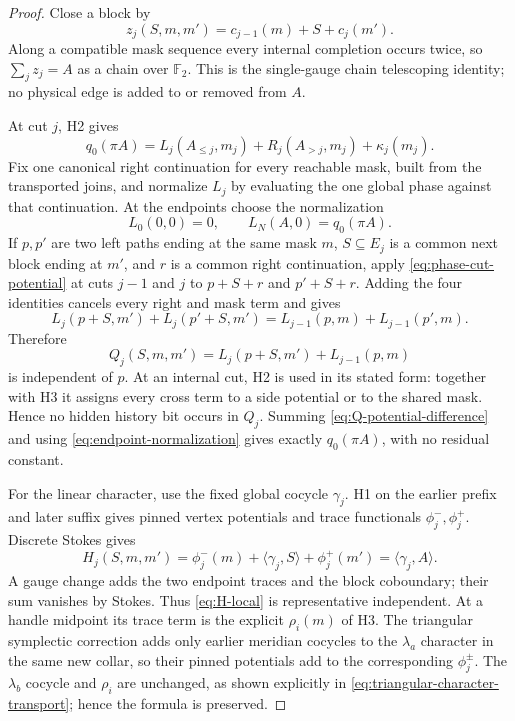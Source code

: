 \documentclass[11pt]{article}
\newcommand{\Ftwo}{\mathbb F_2}
\begin{document}
\begin{proof}
Close a block by
\[
 z_j(S,m,m')=c_{j-1}(m)+S+c_j(m').
\]
Along a compatible mask sequence every internal completion occurs twice, so
\(\sum_jz_j=A\) as a chain over \(\Ftwo\).  This is the single-gauge chain
telescoping identity; no physical edge is added to or removed from \(A\).

At cut \(j\), H2 gives
\begin{equation}\label{eq:phase-cut-potential}
 q_0(\pi A)=L_j(A_{\leq j},m_j)+R_j(A_{>j},m_j)+\kappa_j(m_j).
\end{equation}
Fix one canonical right continuation for every reachable mask, built from
the transported joins, and normalize \(L_j\) by evaluating the one global
phase against that continuation.  At the endpoints choose the normalization
\begin{equation}\label{eq:endpoint-normalization}
 L_0(0,0)=0,\qquad L_N(A,0)=q_0(\pi A).
\end{equation}
If \(p,p'\) are two left paths ending at
the same mask \(m\), \(S\subseteq E_j\) is a common next block ending at
\(m'\), and \(r\) is a common right continuation, apply
\eqref{eq:phase-cut-potential} at cuts \(j-1\) and \(j\) to \(p+S+r\) and
\(p'+S+r\).  Adding the four identities cancels every right and mask term and
gives
\[
 L_j(p+S,m')+L_j(p'+S,m')
 =L_{j-1}(p,m)+L_{j-1}(p',m).
\]
Therefore
\begin{equation}\label{eq:Q-potential-difference}
 Q_j(S,m,m')=L_j(p+S,m')+L_{j-1}(p,m)
\end{equation}
is independent of \(p\).  At an internal cut, H2 is used in its stated form:
together with H3 it assigns every cross term to a side potential or to the
shared mask.  Hence no hidden history bit occurs in \(Q_j\).  Summing
\eqref{eq:Q-potential-difference} and using
\eqref{eq:endpoint-normalization} gives exactly \(q_0(\pi A)\), with no
residual constant.

For the linear character, use the fixed global cocycle \(\gamma_j\).  H1 on
the earlier prefix and later suffix gives pinned vertex potentials and trace
functionals \(\phi_j^-,\phi_j^+\).  Discrete Stokes gives
\begin{equation}\label{eq:H-local}
 H_j(S,m,m')=\phi_j^-(m)+\langle\gamma_j,S\rangle+\phi_j^+(m')
            =\langle\gamma_j,A\rangle.
\end{equation}
A gauge change adds the two endpoint traces and the block coboundary; their
sum vanishes by Stokes.  Thus \eqref{eq:H-local} is representative
independent.  At a handle midpoint its trace term is the explicit
\(\rho_i(m)\) of H3.  The triangular symplectic correction adds only earlier
meridian cocycles to the \(\lambda_a\) character in the same new collar, so
their pinned potentials add to the corresponding \(\phi_j^\pm\).  The
\(\lambda_b\) cocycle and \(\rho_i\) are unchanged, as shown explicitly in
\eqref{eq:triangular-character-transport}; hence the formula is preserved.


\end{proof}
\end{document}
